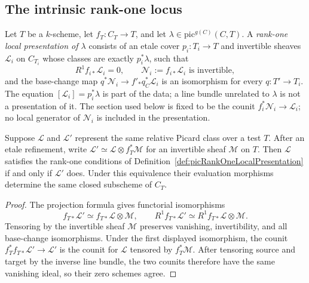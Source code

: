 \subsection{The intrinsic rank-one locus}

\begin{definition}
  \label{def:picRankOneLocalPresentation}
  \leanok
  Let \(T\) be a \(k\)-scheme, let \(f_T\colon C_T\to T\), and let
  \(\lambda\in\mathrm{pic}^{g(C)}(C,T)\).  A \emph{rank-one local presentation of
  \(\lambda\)} consists of an etale cover \(p_i\colon T_i\to T\) and invertible sheaves
  \(\mathcal L_i\) on \(C_{T_i}\) whose classes are exactly
  \(p_i^*\lambda\), such that
  \[
    R^1f_{i*}\mathcal L_i=0,
    \qquad \mathcal N_i:=f_{i*}\mathcal L_i\text{ is invertible},
  \]
  and the base-change map
  \(q^*\mathcal N_i\to f'_*q_C^*\mathcal L_i\) is an isomorphism for every
  \(q\colon T'\to T_i\).  The equation
  \([\mathcal L_i]=p_i^*\lambda\) is part of the data; a line bundle unrelated to
  \(\lambda\) is not a presentation of it.  The section used below is fixed to be the
  counit \(f_i^*\mathcal N_i\to\mathcal L_i\); no local generator of \(\mathcal N_i\) is
  included in the presentation.
\end{definition}

\begin{lemma}
  \label{lem:picRankOnePresentation_change}
  \notready
  Suppose \(\mathcal L\) and \(\mathcal L'\) represent the same relative Picard class over a
  test \(T\).  After an etale refinement, write
  \(\mathcal L'\simeq\mathcal L\otimes f_T^*\mathcal M\) for an invertible sheaf
  \(\mathcal M\) on \(T\).  Then \(\mathcal L\) satisfies the rank-one conditions of
  Definition~\ref{def:picRankOneLocalPresentation} if and only if \(\mathcal L'\) does.
  Under this equivalence their evaluation morphisms determine the same closed subscheme of
  \(C_T\).
\end{lemma}
\begin{proof}
  The projection formula gives functorial isomorphisms
  \[
    f_{T*}\mathcal L'\simeq f_{T*}\mathcal L\otimes\mathcal M,
    \qquad
    R^1f_{T*}\mathcal L'\simeq R^1f_{T*}\mathcal L\otimes\mathcal M.
  \]
  Tensoring by the invertible sheaf \(\mathcal M\) preserves vanishing, invertibility, and
  all base-change isomorphisms.  Under the first displayed isomorphism, the counit
  \(f_T^*f_{T*}\mathcal L'\to\mathcal L'\) is the counit for \(\mathcal L\) tensored by
  \(f_T^*\mathcal M\).  After tensoring source and target by the inverse line bundle, the two
  counits therefore have the same vanishing ideal, so their zero schemes agree.
\end{proof}

